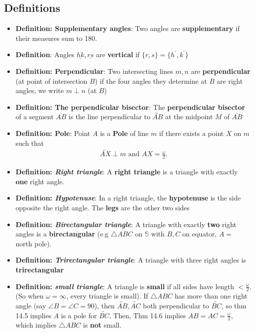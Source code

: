 \documentclass{report}
\begin{document}
    \subsection{Definitions}
    \begin{itemize}
        \item \textbf{Definition: Supplementary angles}: Two angles are \textbf{supplementary} if their measures sum to 180.
        \item \textbf{Definition}: Angles $\underline{hk}, \underline{rs}$ are \textbf{vertical} if $\{r,s\}  = \{h^{\prime}, k^{\prime}\}$
        \item \textbf{Definition: Perpendicular}: Two intersecting lines $m,n$ are \textbf{perpendicular} (at point of intersection $B$) if the four angles they determine at $B$ are right angles, we write $m\perp n$ (at $B$)
        \item \textbf{Definition: The perpendicular bisector}: The \textbf{perpendicular bisector} of a segment $\overline{AB}$ is the line perpendicular to $\overleftrightarrow{AB}$ at the midpoint $M$ of $\overline{AB}$
        \item \textbf{Definition: Pole}: Point $A$ is a \textbf{Pole} of line $m$ if there exists a point $X$ on $m$ such that 
            \begin{align*}
                \overleftrightarrow{AX} \perp m \text{ and } AX = \frac{\omega}{2}
            .\end{align*}
        \item \textbf{Definition: \textit{Right triangle}}: A \textbf{right triangle} is a triangle with exactly \textbf{one} right angle.
        \item \textbf{Definition: \textit{Hypotenuse}}: In a right triangle, the \textbf{hypotenuse} is the side opposite the right angle. The \textbf{legs} are the other two sides
        \item \textbf{Definition: \textit{Birectangular triangle}}: A triangle with exactly \textbf{two} right angles is a \textbf{birectangular} (e.g $\triangle ABC$ on $\mathbb{S}$ with $B,C$ on equator, $A = $ north pole). 
        \item \textbf{Definition: \textit{Trirectangular triangle}}: A triangle with three right angles is \textbf{trirectangular}
        \item \textbf{Definition: \textit{small triangle}}: A triangle is \textbf{small} if all sides have length $< \frac{\omega}{2}$. (So when $\omega = \infty$, every triangle is small).
            \bigbreak \noindent 
            If $\triangle ABC$ has more than one right angle (say $\angle B = \angle C = 90$), then $ \overleftrightarrow{AB}, \overleftrightarrow{AC}$ both perpendicular to $ \overleftrightarrow{BC}$, so thm 14.5 implies $A$ is a pole for $\overleftrightarrow{BC}$. Then, Thm 14.6 implies $AB = AC = \frac{\omega}{2}$, which implies $\triangle ABC$ is \textbf{not} small.

    \end{itemize}
\end{document}
